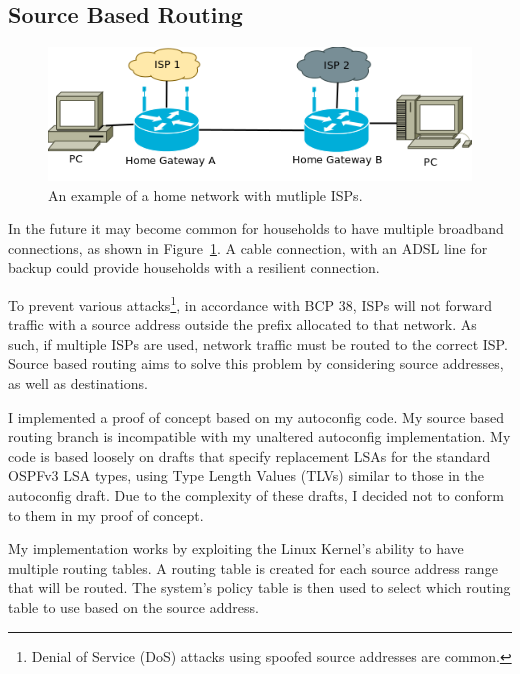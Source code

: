 \documentclass[12pt,a4paper,twoside]{report}
\begin{document}
\subsection{Source Based Routing}
\label{SourceBasedRouting}
\begin{figure}
\begin{center}
	\includegraphics[width=\linewidth]{../Diagrams/Network/MultipleISP.png}
	\caption{An example of a home network with mutliple ISPs.}\label{fig:MultipleISP}
\end{center}
\end{figure}
In the future it may become common for households to have multiple broadband
connections, as shown in Figure~\ref{fig:MultipleISP}. A cable connection, with
an ADSL line for backup could provide households with a resilient connection. 

To prevent various attacks\footnote{Denial of Service
(DoS) attacks using spoofed source
addresses are common.}, in accordance with BCP 38\cite{bcp38}, ISPs will not
forward traffic with a source address outside the prefix allocated to that
network.  As such, if multiple ISPs are used, network traffic must be routed to
the correct ISP. Source based routing aims to solve this problem by considering
source addresses, as well as destinations. 

I implemented a proof of concept based on my autoconfig code. My source based
routing branch is incompatible with my unaltered autoconfig implementation. My
code is based loosely on drafts that specify replacement LSAs for the standard
OSPFv3 LSA types, using Type Length Values (TLVs) similar to those in the
autoconfig draft. Due to the complexity of these drafts, I decided not to
conform to them in my proof of concept.

My implementation works by exploiting the Linux Kernel's ability to have
multiple routing tables. A routing table is created for each source address
range that will be routed. The system's policy table is then used to select
which routing table to use based on the source address.  
\end{document}
